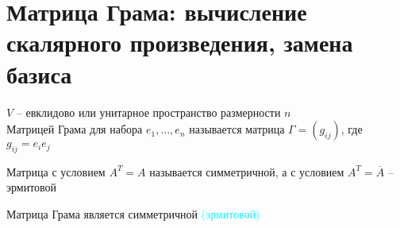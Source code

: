 \section{Матрица Грама: вычисление скалярного произведения, замена базиса}

\begin{definition}
	$ V $ -- евклидово или унитарное пространство размерности $ n $ \\
	Матрицей Грама для набора $ e_1, ..., e_n $ называется матрица $ \Gamma = (g_{ij}) $, где $ g_{ij} = e_ie_j $
\end{definition}

\begin{definition}
	Матрица с условием $ A^T = A $ называется симметричной, а с условием $ A^T = \overline{A} $ -- эрмитовой
\end{definition}

\begin{property}
	Матрица Грама является симметричной \textcolor{cyan}{(эрмитовой)}
\end{property}


